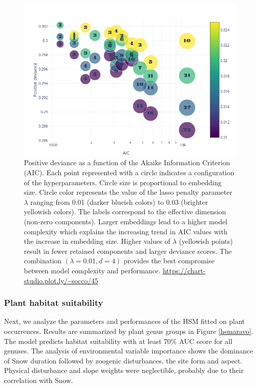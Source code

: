 \documentclass[10pt,a4paper]{article}
\begin{document}
\begin{figure}[bthp]
	\centering
	\includegraphics[scale=0.5]{gridaravo}
	\caption{Positive deviance as a function of the Akaike Information Criterion (AIC). Each point represented with a circle indicates a configuration of the hyperparameters. Circle size is proportional to embedding size. Circle color represents the value of the lasso penalty parameter $\lambda$ ranging from 0.01 (darker blueish colors) to 0.03 (brighter yellowish colors). The labels correspond to the effective dimension (non-zero components). Larger embeddings lead to a higher model complexity which explains the increasing trend in AIC values with the increase in embedding size. Higher values of $\lambda$ (yellowish points) result in fewer retained components and larger deviance scores. The combination $(\lambda=0.01,d=4)$ provides the best compromise between model complexity and performance.  \url{https://chart-studio.plot.ly/~socco/45}}
	\label{gridaravo}
\end{figure}

\subsubsection{Plant habitat suitability}
Next, we analyze the parameters and performances of the HSM fitted on plant occurrences. Results are summarized by plant genus groups in Figure \ref{hsmaravo}. The model predicts habitat suitability with at least $70\%$ AUC score for all genuses. The analysis of environmental variable importance shows the dominance of Snow duration followed by zoogenic disturbances, the site form and aspect. Physical disturbance and slope weights were neglectible, probably due to their correlation with Snow. 
\end{document}
